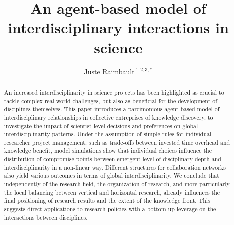 \documentclass[utf8]{frontiersFPHY} %
\def\keyFont{\fontsize{8}{11}\helveticabold }
\def\firstAuthorLast{Raimbault} %
\def\Authors{Juste Raimbault\,$^{1,2,3,*}$}
\begin{document}
\onecolumn
{}

\title[Agent-based modeling interdisciplinarity]{An agent-based model of interdisciplinary interactions in science} 

\author[\firstAuthorLast ]{\Authors} %
\address{} %
\correspondance{} %

\extraAuth{}%


\maketitle


\begin{abstract}

An increased interdisciplinarity in science projects has been highlighted as crucial to tackle complex real-world challenges, but also as beneficial for the development of disciplines themselves. This paper introduces a parcimonious agent-based model of interdisciplinary relationships in collective entreprises of knowledge discovery, to investigate the impact of scientist-level decisions and preferences on global interdisciplinarity patterns. Under the assumption of simple rules for individual researcher project management, such as trade-offs between invested time overhead and knowledge benefit, model simulations show that individual choices influence the distribution of compromise points between emergent level of disciplinary depth and interdisciplinarity in a non-linear way. Different structures for collaboration networks also yield various outcomes in terms of global interdisciplinarity. We conclude that independently of the research field, the organization of research, and more particularly the local balancing between vertical and horizontal research, already influences the final positioning of research results and the extent of the knowledge front. This suggests direct applications to research policies with a bottom-up leverage on the interactions between disciplines.

\tiny
 \keyFont{ \section{Keywords:}} %
\end{abstract}
\end{document}
